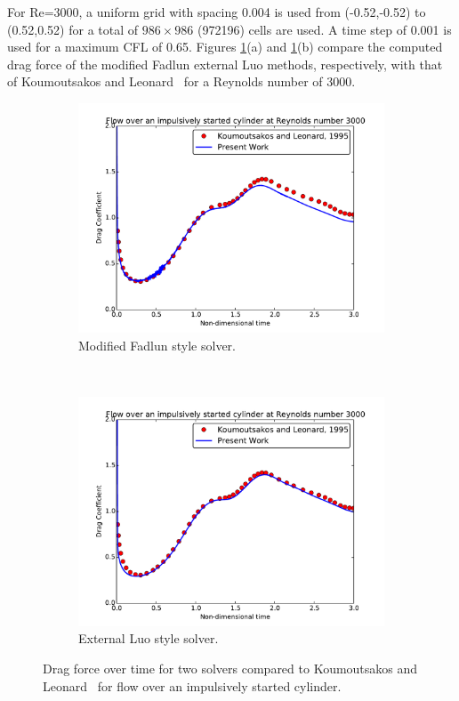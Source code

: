 For Re=3000, a uniform grid with spacing 0.004 is used from (-0.52,-0.52) to (0.52,0.52) for a total of $986\times986$ (972196) cells are used.
A time step of 0.001 is used for a maximum CFL of 0.65.
Figures \ref{fig:cy3000}(a) and \ref{fig:cy3000}(b) compare the computed drag force of the modified Fadlun external Luo methods, respectively, with that of Koumoutsakos and Leonard~\cite{Koumoutsakos:1995bf} for a Reynolds number of 3000.
\begin{figure}[!htb]
	\centering
	\begin{subfigure}{0.4\textwidth}
		\includegraphics[width=\linewidth]{cy3000fadlun}
		\caption{Modified Fadlun style solver.}
	\end{subfigure}
	~
	\begin{subfigure}{0.4\textwidth}
		\includegraphics[width=\linewidth]{cy3000luo}
		\caption{External Luo style solver.}
	\end{subfigure}
	\caption{Drag force over time for two solvers compared to Koumoutsakos and Leonard~\cite{Koumoutsakos:1995bf} for flow over an impulsively started cylinder.}
	\label{fig:cy3000}
\end{figure}

